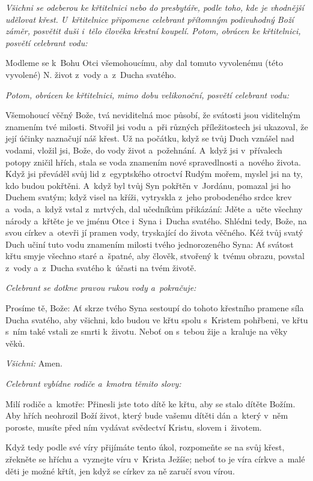 \textit{Všichni se odeberou ke křtitelnici nebo do presbytáře, podle toho, kde je vhodnější udělovat křest.
U~křtitelnice připomene celebrant přítomným podivuhodný Boží záměr, posvětit duši i~tělo člověka křestní koupelí.
Potom, obrácen ke křtitelnici, posvětí celebrant vodu:}

Modleme se k~Bohu Otci všemohoucímu, aby dal tomuto vyvolenému (této
vyvolené) {\color{red}N.} život z~vody a~z~Ducha svatého.

\textit{Potom, obrácen ke křtitelnici, mimo dobu velikonoční, posvětí celebrant vodu:}

Všemohoucí věčný Bože, tvá neviditelná moc působí,
že svátosti jsou viditelným znamením tvé milosti.
Stvořil jsi vodu a~při různých příležitostech jsi ukazoval,
že její účinky naznačují náš křest.
Už na počátku, když se tvůj Duch vznášel nad vodami,
vložil jsi, Bože, do vody život a~požehnání.
A~když jsi v~přívalech potopy zničil hřích,
stala se voda znamením
nové spravedlnosti a~nového života.
Když jsi převáděl svůj lid
z~egyptského otroctví Rudým mořem,
myslel jsi na ty, kdo budou pokřtěni. 	
A~když byl tvůj Syn pokřtěn v~Jordánu,
pomazal jsi ho Duchem svatým;
když visel na kříži,
vytryskla z~jeho probodeného srdce krev a~voda,
a~když vstal z~mrtvých, dal učedníkům přikázání:
Jděte a~učte všechny národy a~křtěte je
ve jménu Otce i~Syna i~Ducha svatého.
Shlédni tedy, Bože, na svou církev
a~otevři jí pramen vody,
tryskající do života věčného.
Kéž tvůj svatý Duch učiní tuto vodu
znamením milosti tvého jednorozeného Syna:
Ať svátost křtu smyje všechno staré a~špatné,
aby člověk, stvořený k~tvému obrazu,
povstal z~vody a~z~Ducha svatého k~účasti na tvém životě. 	

\textit{Celebrant se dotkne pravou rukou vody a~pokračuje:}

Prosíme tě, Bože:
Ať skrze tvého Syna
sestoupí do tohoto křestního pramene síla Ducha svatého,
aby všichni, kdo budou ve křtu
spolu s~Kristem pohřbeni,
ve křtu s~ním také vstali ze smrti k~životu.
Neboť on s~tebou žije a~kraluje na věky věků.

\textit{Všichni:} Amen.

\pars{}

\textit{Celebrant vybídne rodiče a~kmotra těmito slovy:}

Milí rodiče a~kmotře: Přinesli jste toto dítě ke křtu, aby se stalo dítěte Božím.
Aby hřích neohrozil Boží život, který bude vašemu dítěti dán a~který v~něm poroste,
musíte před ním vydávat svědectví Kristu, slovem i~životem.

Když tedy podle své víry přijímáte tento úkol, rozpomeňte se na svůj křest,
zřekněte se hříchu a~vyznejte víru v~Krista Ježíše; neboť to je víra církve
a~malé děti je možné křtít, jen když se církev za ně zaručí svou vírou.

